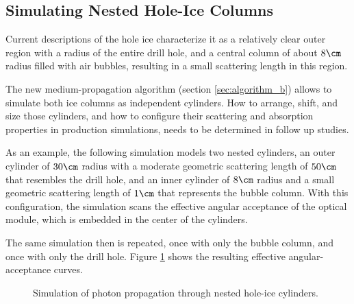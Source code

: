 
\subsection{Simulating Nested Hole-Ice Columns}
\label{sec:nested_cylinders}

Current descriptions of the hole ice characterize it as a relatively clear outer region with a radius of the entire drill hole, and a central column of about $8\cm$ radius filled with air bubbles, resulting in a small scattering length in this region. \cite{instrumentation,icrc17pocam,rongenswedishcamera,martinspicehddard}


The new medium-propagation algorithm (section \ref{sec:algorithm_b}) allows to simulate both ice columns as independent cylinders. How to arrange, shift, and size those cylinders, and how to configure their scattering and absorption properties in production simulations, needs to be determined in follow up studies.\followup

As an example, the following simulation models two nested cylinders, an outer cylinder of $30\cm$ radius with a moderate geometric scattering length of $50\cm$ that resembles the drill hole, and an inner cylinder of $8\cm$ radius and a small geometric scattering length of $1\cm$ that represents the bubble column. With this configuration, the simulation scans the effective angular acceptance of the optical module, which is embedded in the center of the cylinders.


The same simulation then is repeated, once with only the bubble column, and once with only the drill hole. Figure \ref{fig:haiv2IGi} shows the resulting effective angular-acceptance curves.

\begin{figure}[htbp]
  \hfill
  \caption{Simulation of photon propagation through nested hole-ice cylinders.}
  \label{fig:haiv2IGi}
\end{figure}

